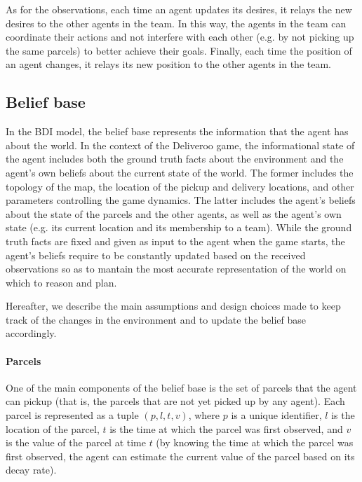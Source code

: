 As for the observations, each time an agent updates its desires, it relays the new desires to the other agents in the team. In this way, the agents in the team can coordinate their actions and not interfere with each other (e.g. by not picking up the same parcels) to better achieve their goals. Finally, each time the position of an agent changes, it relays its new position to the other agents in the team.


\subsection{Belief base}
\label{sec:belief-base}

In the BDI model, the belief base represents the information that the agent has about the world. In the context of the Deliveroo game, the informational state of the agent includes both the ground truth facts about the environment and the agent's own beliefs about the current state of the world. The former includes the topology of the map, the location of the pickup and delivery locations, and other parameters controlling the game dynamics. The latter includes the agent's beliefs about the state of the parcels and the other agents, as well as the agent's own state (e.g. its current location and its membership to a team). While the ground truth facts are fixed and given as input to the agent when the game starts, the agent's beliefs require to be constantly updated based on the received observations so as to mantain the most accurate representation of the world on which to reason and plan.

Hereafter, we describe the main assumptions and design choices made to keep track of the changes in the environment and to update the belief base accordingly.

\paragraph*{Parcels}
One of the main components of the belief base is the set of parcels that the agent can pickup (that is, the parcels that are not yet picked up by any agent). Each parcel is represented as a tuple $(p, l, t, v)$, where $p$ is a unique identifier, $l$ is the location of the parcel, $t$ is the time at which the parcel was first observed, and $v$ is the value of the parcel at time $t$ (by knowing the time at which the parcel was first observed, the agent can estimate the current value of the parcel based on its decay rate).

